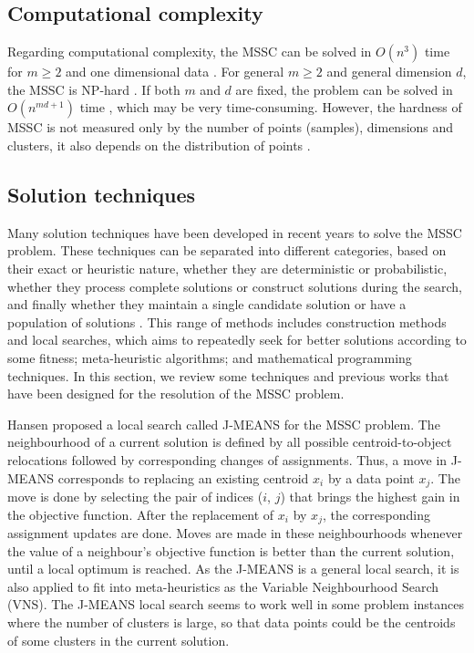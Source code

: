 \subsection{Computational complexity}
Regarding computational complexity, the MSSC can be solved in $O(n^3)$ time for $m \geq 2$ and one dimensional data \cite{Spath1980}. For general $m \geq 2$ and general dimension $d$, the MSSC is NP-hard \cite{Aloise2009}. If both $m$ and $d$ are fixed, the problem can be solved in $O(n^{md+1})$ time \cite{Inaba1994}, which may be very time-consuming. However, the hardness of MSSC is not measured only by the number of points (samples), dimensions and clusters, it also depends on the distribution of points \cite{Aloise2009Branch}.


\subsection{Solution techniques}
Many solution techniques have been developed in recent years to solve the MSSC problem. These techniques can be separated into different categories, based on their exact or heuristic nature, whether they are deterministic or probabilistic, whether they process complete solutions or construct solutions during the search, and finally whether they maintain a single candidate solution or have a population of solutions \cite{Das2009}. This range of methods includes construction methods and local searches, which aims to repeatedly seek for better solutions according to some fitness; meta-heuristic algorithms; and mathematical programming techniques. In this section, we review some techniques and previous works that have been designed for the resolution of the MSSC problem.

Hansen \cite{Hansen2001} proposed a local search called J-MEANS for the MSSC problem. The neighbourhood of a current solution is defined by all possible centroid-to-object relocations followed by corresponding changes of assignments. Thus, a move in J-MEANS corresponds to replacing an existing centroid $x_i$ by a data point $x_j$. The move is done by selecting the pair of indices ($i$, $j$) that brings the highest gain in the objective function. After the replacement of $x_i$ by $x_j$, the corresponding assignment updates are done. Moves are made in these neighbourhoods whenever the value of a neighbour's objective function is better than the current solution, until a local optimum is reached. As the J-MEANS is a general local search, it is also applied to fit into meta-heuristics as the Variable Neighbourhood Search (VNS). The J-MEANS local search seems to work well in some problem instances where the number of clusters is large, so that data points could be the centroids of some clusters in the current solution.

